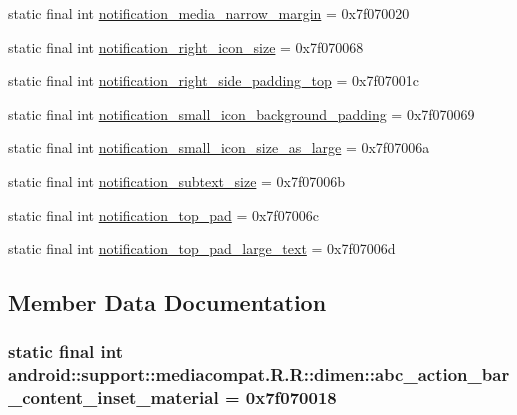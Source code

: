 \begin{CompactItemize}
\item 
static final int \hyperlink{classandroid_1_1support_1_1mediacompat_1_1_r_1_1dimen_6f124de82019e445a38570d727aca46c}{notification\_\-media\_\-narrow\_\-margin} = 0x7f070020
\item 
static final int \hyperlink{classandroid_1_1support_1_1mediacompat_1_1_r_1_1dimen_c2e2ae3075335400913854c59f417632}{notification\_\-right\_\-icon\_\-size} = 0x7f070068
\item 
static final int \hyperlink{classandroid_1_1support_1_1mediacompat_1_1_r_1_1dimen_f17a74758f3fbf694e1ff5102db46675}{notification\_\-right\_\-side\_\-padding\_\-top} = 0x7f07001c
\item 
static final int \hyperlink{classandroid_1_1support_1_1mediacompat_1_1_r_1_1dimen_b7e38eeeac23e708cb4bd243aa5aaf33}{notification\_\-small\_\-icon\_\-background\_\-padding} = 0x7f070069
\item 
static final int \hyperlink{classandroid_1_1support_1_1mediacompat_1_1_r_1_1dimen_0dab7e9694237422135dc48ee74759d3}{notification\_\-small\_\-icon\_\-size\_\-as\_\-large} = 0x7f07006a
\item 
static final int \hyperlink{classandroid_1_1support_1_1mediacompat_1_1_r_1_1dimen_9da6f3a387a10356ce30ac32f88510b0}{notification\_\-subtext\_\-size} = 0x7f07006b
\item 
static final int \hyperlink{classandroid_1_1support_1_1mediacompat_1_1_r_1_1dimen_44999e450d9f2108ec19c4979f7506d8}{notification\_\-top\_\-pad} = 0x7f07006c
\item 
static final int \hyperlink{classandroid_1_1support_1_1mediacompat_1_1_r_1_1dimen_707b10105853c786ec8caf8e968d4eaa}{notification\_\-top\_\-pad\_\-large\_\-text} = 0x7f07006d
\end{CompactItemize}


\subsection{Member Data Documentation}
\hypertarget{classandroid_1_1support_1_1mediacompat_1_1_r_1_1dimen_fda4c6c14dee07faf88843cedeb95a0c}{
\subsubsection[{abc\_\-action\_\-bar\_\-content\_\-inset\_\-material}]{\setlength{\rightskip}{0pt plus 5cm}static final int android::support::mediacompat.R.R::dimen::abc\_\-action\_\-bar\_\-content\_\-inset\_\-material = 0x7f070018}}
\label{classandroid_1_1support_1_1mediacompat_1_1_r_1_1dimen_fda4c6c14dee07faf88843cedeb95a0c}


